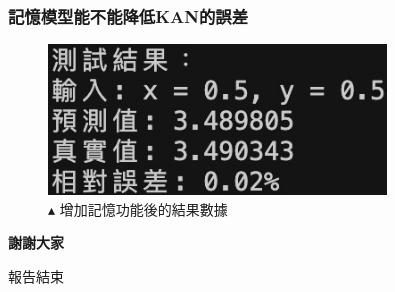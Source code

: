\documentclass{beamer}
\begin{document}
\begin{frame}
    \frametitle{記憶模型能不能降低KAN的誤差}
    \begin{figure}
        \centering
        \begin{minipage}{\textwidth}
            \includegraphics[width=0.8\textwidth,keepaspectratio]{figures/增加記憶功能後的結果.jpg}
            \centering
            \caption*{$\blacktriangle$ 增加記憶功能後的結果數據}
        \end{minipage}
    \end{figure}
\end{frame}

\begin{frame}
    \begin{center}
        \Huge\textbf{謝謝大家}
        
        \vspace{1em}
        \Large 報告結束
    \end{center}
\end{frame}
\end{document}
